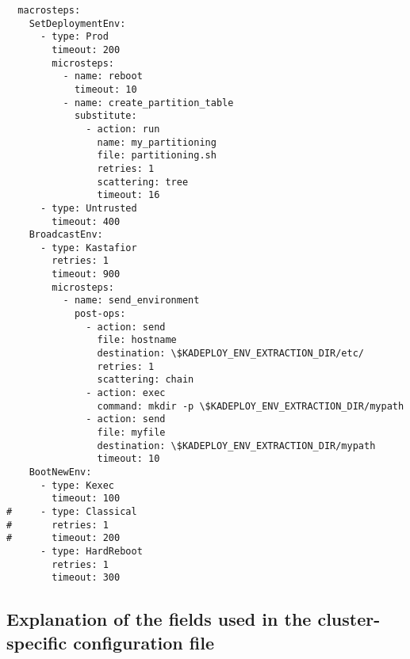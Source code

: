 \documentclass[a4wide,10pt,oneside]{book}
\begin{document}
\begin{small}
\begin{verbatim}
  macrosteps:
    SetDeploymentEnv:
      - type: Prod
        timeout: 200
        microsteps:
          - name: reboot
            timeout: 10
          - name: create_partition_table
            substitute:
              - action: run
                name: my_partitioning
                file: partitioning.sh
                retries: 1
                scattering: tree
                timeout: 16
      - type: Untrusted
        timeout: 400
    BroadcastEnv: 
      - type: Kastafior
        retries: 1
        timeout: 900
        microsteps:
          - name: send_environment
            post-ops:
              - action: send
                file: hostname
                destination: \$KADEPLOY_ENV_EXTRACTION_DIR/etc/
                retries: 1
                scattering: chain
              - action: exec
                command: mkdir -p \$KADEPLOY_ENV_EXTRACTION_DIR/mypath
              - action: send
                file: myfile
                destination: \$KADEPLOY_ENV_EXTRACTION_DIR/mypath
                timeout: 10
    BootNewEnv: 
      - type: Kexec
        timeout: 100
#     - type: Classical
#       retries: 1
#       timeout: 200
      - type: HardReboot
        retries: 1
        timeout: 300
\end{verbatim}
\end{small}

\subsection{Explanation of the fields used in the cluster-specific configuration file\label{sec:specific_config}}
\end{document}
